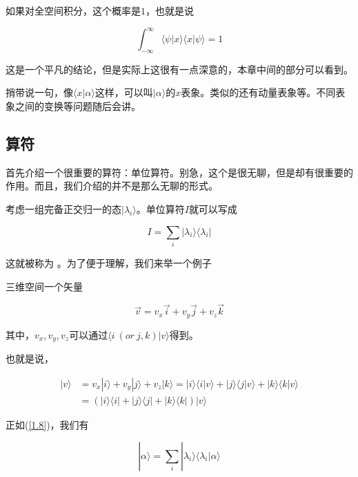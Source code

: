 如果对全空间积分，这个概率是$1$，也就是说

\begin{equation}
\int_{-\infty}^{\infty}\langle\psi|x\rangle\langle x|\psi\rangle = 1
\end{equation}

这是一个平凡的结论，但是实际上这很有一点深意的，本章中间的部分可以看到。

捎带说一句，像$\langle x|\alpha\rangle$这样，可以叫$|\alpha \rangle$的$x$表象。类似的还有动量表象等。不同表象之间的变换等问题随后会讲。\\

\subsection{算符}

首先介绍一个很重要的算符：单位算符。别急，这个是很无聊，但是却有很重要的作用。而且，我们介绍的并不是那么无聊的形式。

考虑一组完备正交归一的态$|\lambda_i\rangle$。单位算符$I$就可以写成

\begin{equation}\label{1.8}
I = \sum_i |\lambda_i\rangle\langle\lambda_i|
\end{equation}

这就被称为 。为了便于理解，我们来举一个例子

\begin{exam}{}
三维空间一个矢量

\begin{equation}
\vec{v} = v_x\vec{i} + v_y\vec{j} + v_z \vec{k} 
\end{equation}

其中，$v_x, v_y, v_z$可以通过$\langle i\ (or\ j, k)|v\rangle$得到。

也就是说，

\begin{equation}
\begin{split}
|v\rangle &= v_x|i\rangle + v_y|j\rangle + v_z|k\rangle = |i\rangle\langle i|v\rangle + |j\rangle\langle j|v\rangle + |k\rangle\langle k|v\rangle\\ &= (|i\rangle\langle i|+|j\rangle\langle j|+|k\rangle\langle k|)|v\rangle
\end{split}
\end{equation}
\end{exam}{}

正如(\ref{1.8})，我们有

\begin{equation}
|\alpha\rangle = \sum_i |\lambda_i\rangle\langle\lambda_i|\alpha\rangle
\end{equation}

